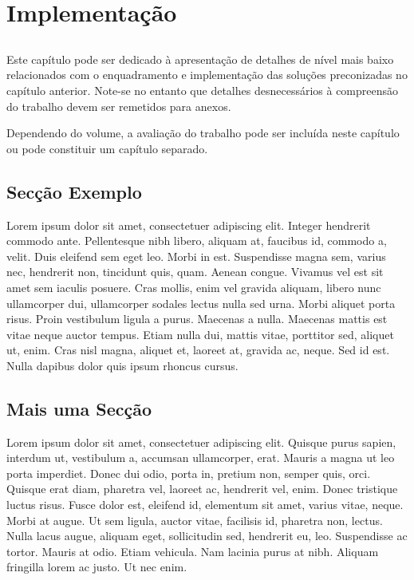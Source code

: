 \chapter{Implementação}\label{chap:setup-validation}

\section*{}

Este capítulo pode ser dedicado à apresentação de detalhes de nível
mais baixo relacionados com o enquadramento e implementação das
soluções preconizadas no capítulo anterior.
Note-se no entanto que detalhes desnecessários à compreensão do
trabalho devem ser remetidos para anexos.

Dependendo do volume, a avaliação do trabalho pode ser incluída neste
capítulo ou pode constituir um capítulo separado.

\section{Secção Exemplo}


Lorem ipsum dolor sit amet, consectetuer adipiscing elit. Integer
hendrerit commodo ante. Pellentesque nibh libero, aliquam at, faucibus
id, commodo a, velit. 
Duis eleifend sem eget leo. Morbi in est. Suspendisse magna sem,
varius nec, hendrerit non, tincidunt quis, quam. Aenean congue. 
Vivamus vel est sit amet sem iaculis posuere. Cras mollis, enim vel
gravida aliquam, libero nunc ullamcorper dui, ullamcorper sodales
lectus nulla sed urna. Morbi aliquet porta risus. 
Proin vestibulum ligula a purus. Maecenas a nulla. 
Maecenas mattis est vitae neque auctor tempus. Etiam nulla dui,
mattis vitae, porttitor sed, aliquet ut, enim. Cras nisl magna,
aliquet et, laoreet at, gravida ac, neque. Sed id est. Nulla dapibus
dolor quis ipsum rhoncus cursus. 

\section{Mais uma Secção}

Lorem ipsum dolor sit amet, consectetuer adipiscing elit. Quisque
purus sapien, interdum ut, vestibulum a, accumsan ullamcorper,
erat. Mauris a magna ut leo porta imperdiet. Donec dui odio, porta in,
pretium non, semper quis, orci. Quisque erat diam, pharetra vel,
laoreet ac, hendrerit vel, enim. Donec tristique luctus risus. Fusce
dolor est, eleifend id, elementum sit amet, varius vitae, neque. Morbi
at augue. Ut sem ligula, auctor vitae, facilisis id, pharetra non,
lectus. Nulla lacus augue, aliquam eget, sollicitudin sed, hendrerit
eu, leo. Suspendisse ac tortor. Mauris at odio. Etiam vehicula. Nam
lacinia purus at nibh. Aliquam fringilla lorem ac justo. Ut nec
enim. 


